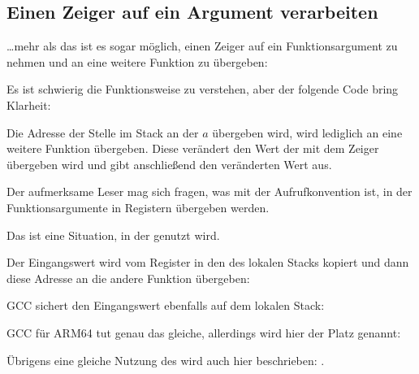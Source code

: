 \subsection{Einen Zeiger auf ein Argument verarbeiten}
\label{pointer_to_argument}

\dots mehr als das ist es sogar möglich, einen Zeiger auf ein Funktionsargument
zu nehmen und an eine weitere Funktion zu übergeben:



Es ist schwierig die Funktionsweise zu verstehen, aber der folgende Code bring Klarheit:



Die Adresse der Stelle im Stack an der $a$ übergeben wird, wird lediglich an eine
weitere Funktion übergeben.
Diese verändert den Wert der mit dem Zeiger übergeben wird und \printf gibt anschließend
den veränderten Wert aus.

\par Der aufmerksame Leser mag sich fragen, was mit der Aufrufkonvention ist, in der
Funktionsargumente in Registern übergeben werden.

Das ist eine Situation, in der  genutzt wird.

Der Eingangswert wird vom Register in den  des lokalen Stacks
kopiert und dann diese Adresse an die andere Funktion übergeben:



GCC sichert den Eingangswert ebenfalls auf dem lokalen Stack:



GCC für ARM64 tut genau das gleiche, allerdings wird hier der Platz  genannt:



Übrigens eine gleiche Nutzung des  wird auch hier beschrieben: .
